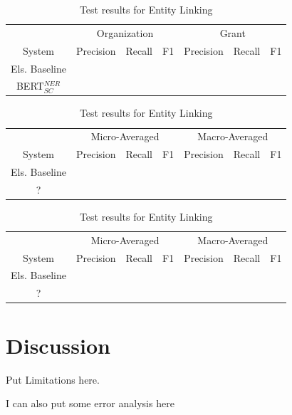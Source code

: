 \documentclass{report}
\theoremstyle{definition}
\theoremstyle{remark}
\begin{document}
\begin{table}[h!]
    \centering
    \begin{tabular}{c| c c c c c c}
    &\multicolumn{3}{c}{Organization}&\multicolumn{3}{c}{Grant} \\
    System&Precision&Recall&F1&Precision&Recall&F1\\
    \hline
    Els. Baseline & &&&&& \\[0.7ex]
    BERT$^{NER}_{SC}$ & &&&	&& \\[0.7ex]
    \end{tabular}
    \caption{Test results for Named Entity Recognition}
    \label{tab:trner}
    
    
    
    \vspace*{0.5cm}\begin{tabular}{c|ccc|ccc}
    &\multicolumn{3}{c|}{Micro-Averaged}&\multicolumn{3}{c}{Macro-Averaged}\\
     System  & Precision & Recall & F1 & Precision & Recall & F1   \\
    \hline
    Els. Baseline      & &&&&&\\[0.7ex]
     ?         &&&&&&\\[0.7ex]
    \end{tabular}
    \caption{Test results for Entity Disambiguation}
    \label{tab:tred}
    
    \vspace*{0.5cm}\begin{tabular}{c|ccc|ccc}
    &\multicolumn{3}{c|}{Micro-Averaged}&\multicolumn{3}{c}{Macro-Averaged}\\
     System  & Precision & Recall & F1 & Precision & Recall & F1   \\
    \hline
    Els. Baseline      & &&&&&\\[0.7ex]
    ?         &&&&&&\\[0.7ex]
    \end{tabular}
    \caption{Test results for Entity Linking}
    \label{tab:trel}
    
\end{table}





\chapter{Discussion}
Put Limitations here.

I can also put some error analysis here
\end{document}
